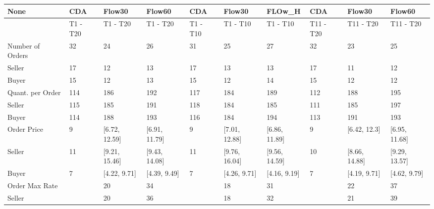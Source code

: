 \begin{tabular}{llllllllll}
\hline
 None                   & CDA      & Flow30        & Flow60        & CDA      & Flow30        & FLOw\_H        & CDA       & Flow30        & Flow60        \\
\hline
                        & T1 - T20 & T1 - T20      & T1 - T20      & T1 - T10 & T1 - T10      & T1 - T10      & T11 - T20 & T11 - T20     & T11 - T20     \\
 Number of Orders       & 32       & 24            & 26            & 31       & 25            & 27            & 32        & 23            & 25            \\
 Seller                 & 17       & 12            & 13            & 17       & 13            & 13            & 17        & 11            & 12            \\
 Buyer                  & 15       & 12            & 13            & 15       & 12            & 14            & 15        & 12            & 12            \\
 Quant. per Order       & 114      & 186           & 192           & 117      & 184           & 189           & 112       & 188           & 195           \\
 Seller                 & 115      & 185           & 191           & 118      & 184           & 185           & 111       & 185           & 197           \\
 Buyer                  & 114      & 188           & 193           & 116      & 184           & 194           & 113       & 191           & 193           \\
 Order Price            & 9        & [6.72, 12.59] & [6.91, 11.79] & 9        & [7.01, 12.88] & [6.86, 11.89] & 9         & [6.42, 12.3]  & [6.95, 11.68] \\
 Seller                 & 11       & [9.21, 15.46] & [9.43, 14.08] & 11       & [9.76, 16.04] & [9.56, 14.59] & 10        & [8.66, 14.88] & [9.29, 13.57] \\
 Buyer                  & 7        & [4.22, 9.71]  & [4.39, 9.49]  & 7        & [4.26, 9.71]  & [4.16, 9.19]  & 7         & [4.19, 9.71]  & [4.62, 9.79]  \\
 Order Max Rate         &          & 20            & 34            &          & 18            & 31            &           & 22            & 37            \\
 Seller                 &          & 20            & 36            &          & 18            & 32            &           & 21            & 39            \\

\end{tabular}
